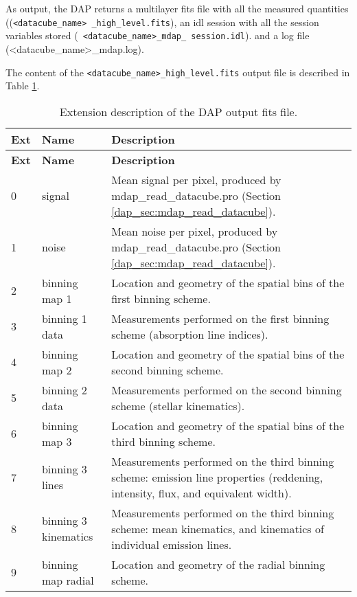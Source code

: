 As output, the DAP returns a multilayer fits file with all the
measured quantities (({\tt <datacube\_name> \_high\_level.fits}), an
idl session with all the session variables stored ({\tt
  <datacube\_name>\_mdap\_ session.idl}).  and a log file
(<datacube\_name>\_mdap.log).

The content of the {\tt <datacube\_name>\_high\_level.fits} output
file is described in Table \ref{dap_tab:output}.


\begin{center}
\begin{longtable}{p{0.5cm}|p{3.5cm}| p{10.1cm}}
\caption{Extension description of the DAP output fits file.} \label{dap_tab:output} \\
\hline
{\bf Ext} &  {\bf Name} &{\bf Description} \\
\hline
\endfirsthead
\hline
{\bf Ext} &  {\bf Name} &{\bf Description} \\
\hline
\endhead
\hline
\endlastfoot
\hline
0 & signal              & Mean signal per pixel, produced by mdap\_read\_datacube.pro (Section \ref{dap_sec:mdap_read_datacube}). \\
1 & noise               & Mean noise per pixel, produced by mdap\_read\_datacube.pro (Section \ref{dap_sec:mdap_read_datacube}).\\
2 & binning map 1       & Location and geometry of the spatial bins of the first binning scheme.\\ 
3 & binning 1 data      & Measurements performed on the first binning scheme (absorption line indices).\\ 
4 & binning map 2       & Location and geometry of the spatial bins of the second binning scheme.\\ 
5 & binning 2 data      & Measurements performed on the second binning scheme (stellar kinematics). \\ 
6 & binning map 3       & Location and geometry of the spatial bins of the third binning scheme.\\ 
7 & binning 3 lines      & Measurements performed on the third binning scheme: emission line properties (reddening, intensity, flux, and equivalent width).\\ 
8 & binning 3 kinematics      & Measurements performed on the third binning scheme: mean kinematics, and kinematics of individual emission lines.\\ 
9 & binning map radial  & Location and geometry of the radial binning scheme.\\ 

\end{longtable}
\end{center}

